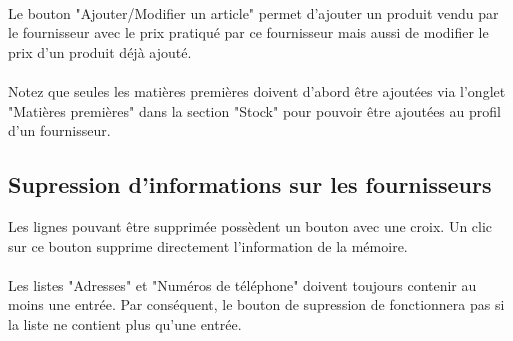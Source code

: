 \paragraph{}
Le bouton "Ajouter/Modifier un article" permet d'ajouter un produit vendu par le
fournisseur avec le prix pratiqué par ce fournisseur mais aussi de modifier le
prix d'un produit déjà ajouté.

\paragraph{}
Notez que seules les matières premières doivent
d'abord être ajoutées via l'onglet "Matières premières" dans la section "Stock"
pour pouvoir être ajoutées au profil d'un fournisseur.

\subsection{Supression d'informations sur les fournisseurs}
Les lignes pouvant être supprimée possèdent
un bouton avec une croix. Un clic sur ce bouton supprime directement
l'information de la mémoire.

\paragraph{}
Les listes "Adresses" et "Numéros de téléphone" doivent toujours contenir au
moins une entrée. Par conséquent, le bouton de supression de fonctionnera pas
si la liste ne contient plus qu'une entrée.
